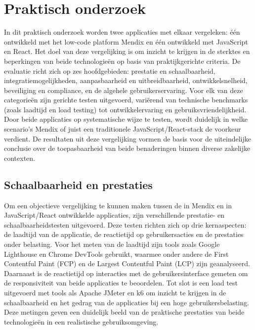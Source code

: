 \section{Praktisch onderzoek}
In dit praktisch onderzoek worden twee applicaties met elkaar vergeleken: één ontwikkeld met het low-code platform Mendix en één ontwikkeld met JavaScript en React. Het doel van deze vergelijking is om inzicht te krijgen in de sterktes en beperkingen van beide technologieën op basis van praktijkgerichte criteria. De evaluatie richt zich op zes hoofdgebieden: prestatie en schaalbaarheid, integratiemogelijkheden, aanpasbaarheid en uitbreidbaarheid, ontwikkelsnelheid, beveiliging en compliance, en de algehele gebruikerservaring. Voor elk van deze categorieën zijn gerichte testen uitgevoerd, variërend van technische benchmarks (zoals laadtijd en load testing) tot ontwikkelervaring en gebruiksvriendelijkheid. Door beide applicaties op systematische wijze te testen, wordt duidelijk in welke scenario’s Mendix of juist een traditionele JavaScript/React-stack de voorkeur verdient. De resultaten uit deze vergelijking vormen de basis voor de uiteindelijke conclusie over de toepasbaarheid van beide benaderingen binnen diverse zakelijke contexten.
\subsection{Schaalbaarheid en prestaties}
Om een objectieve vergelijking te kunnen maken tussen de in Mendix en in JavaScript/React ontwikkelde applicaties, zijn verschillende prestatie- en schaalbaarheidstesten uitgevoerd. Deze testen richten zich op drie kernaspecten: de laadtijd van de applicatie, de reactietijd op gebruikersacties en de prestaties onder belasting. Voor het meten van de laadtijd zijn tools zoals Google Lighthouse en Chrome DevTools gebruikt, waarmee onder andere de First Contentful Paint (FCP) en de Largest Contentful Paint (LCP) zijn geanalyseerd. Daarnaast is de reactietijd op interacties met de gebruikersinterface gemeten om de responsiviteit van beide applicaties te beoordelen. Tot slot is een load test uitgevoerd met tools als Apache JMeter en k6 om inzicht te krijgen in de schaalbaarheid en het gedrag van de applicaties bij een hoge gebruikersbelasting. Deze metingen geven een duidelijk beeld van de praktische prestaties van beide technologieën in een realistische gebruiksomgeving.

